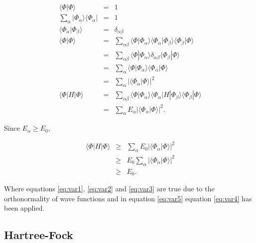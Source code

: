 \begin{eqnarray}
\ \langle \Phi | \Phi \rangle &=& 1 \label{eq:var1} \\
\ \sum_{\alpha} | \Phi_{\alpha} \rangle \langle \Phi_{\alpha} | &=&1 \label{eq:var2} \\
\ \langle \Phi_{\alpha} | \Phi_{\beta} \rangle &=& \delta_{\alpha \beta} \label{eq:var3} \\
\  \langle \Phi | \Phi \rangle &=& \sum_{\alpha \beta} \langle \Phi | \Phi_{\alpha} \rangle \langle \Phi_{\alpha} | \Phi_{\beta} \rangle \langle \Phi_{\beta} | \Phi \rangle \nonumber \\
\ &=& \sum_{\alpha \beta}  \langle \Phi | \Phi_{\alpha} \rangle \delta_{\alpha \beta}  \langle \Phi_{\beta} | \Phi \rangle \nonumber \\
\ &=& \sum_{\alpha} \langle \Phi | \Phi_{\alpha} \rangle \langle \Phi_{\alpha} | \Phi \rangle \nonumber \\
\ &=& \sum_{\alpha} | \langle \Phi_{\alpha} | \Phi \rangle |^2 \label{eq:var4} \\
\ \langle \Phi | H | \Phi \rangle &=& \sum_{\alpha \beta} \langle \Phi | \Phi_{\alpha} \rangle \langle \Phi_{\alpha} | H | \Phi_{\beta} \rangle \langle \Phi_{\beta} | \Phi \rangle \nonumber \\
\ &=& \sum_{\alpha}E_{\alpha} | \langle \Phi_{\alpha} | \Phi \rangle |^2 \label{eq:var5} .
\end{eqnarray}

Since $E_{\alpha}\ge E_0$,

\begin{eqnarray}
\ \langle \Phi | H | \Phi \rangle &\ge& \sum_{\alpha} E_0 | \langle \Phi_{\alpha} | \Phi \rangle |^2 \nonumber \\
\ &\ge& E_0 \sum_{\alpha} | \langle \Phi_{\alpha} | \Phi \rangle |^2 \nonumber \\
\ &\ge& E_0 .
\end{eqnarray}

Where equations \ref{eq:var1}, \ref{eq:var2} and \ref{eq:var3} are true due to the orthonormality of wave functions and in equation \ref{eq:var5} equation \ref{eq:var4} has been applied.

\subsection{Hartree-Fock}

